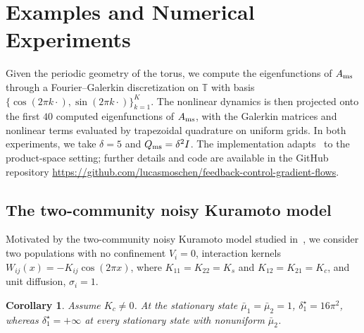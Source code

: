 \documentclass[letterpaper, 10pt, conference]{ieeeconf}
\newtheorem{corollary}[theorem]{Corollary}
\newcommand{\T}{\mathbb{T}}
\begin{document}
\section{Examples and Numerical Experiments}
\label{sec:numerics}

Given the periodic geometry of the torus, we compute the eigenfunctions of $A_{\rm ms}$ through a Fourier--Galerkin discretization on $\T$ with basis $\{\cos(2\pi k \cdot), \sin(2\pi k \cdot)\}_{k=1}^K$.
The nonlinear dynamics is then projected onto the first $40$ computed eigenfunctions of $A_{\rm ms}$, with the Galerkin matrices and nonlinear terms evaluated by trapezoidal quadrature on uniform grids.
In both experiments, we take $\delta = 5$ and $Q_{\rm ms} = \delta^2 I$.
The implementation adapts~\cite{KaliseMoschenPavliotis2025} to the product-space setting; further details and code are available in the GitHub repository \url{https://github.com/lucasmoschen/feedback-control-gradient-flows}.

\subsection{The two-community noisy Kuramoto model}

Motivated by the two-community noisy Kuramoto model studied in~\cite{Meylahn2020}, we consider two populations with no confinement $V_i = 0$, interaction kernels $W_{ij}(x) = -K_{ij}\cos(2\pi x)$, where $K_{11} = K_{22} = K_s$ and $K_{12} = K_{21} = K_c$, and unit diffusion, $\sigma_i = 1$.

\begin{corollary}
    \label{cor:cosine_visibility_dichotomy}
    Assume $K_c \neq 0$.
    At the stationary state $\bar\mu_1 = \bar\mu_2 = 1$, $\delta_1^\star = 16\pi^2$, whereas $\delta_1^\star = +\infty$ at every stationary state with nonuniform $\bar\mu_2$.
\end{corollary}
\end{document}
